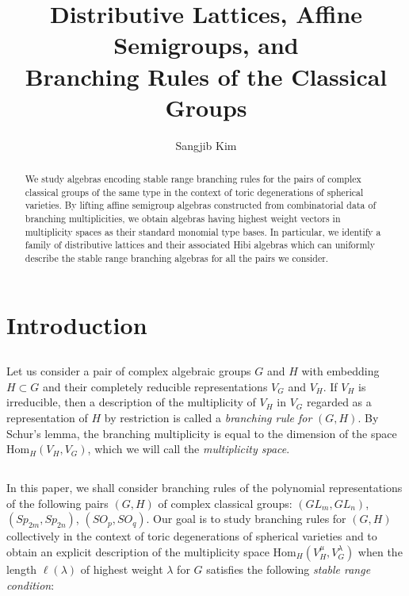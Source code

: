 \documentclass[11pt]{amsart}
\numberwithin{equation}{subsection}
\begin{document}
\title[Stable Range Branching Algebras]{Distributive Lattices, Affine Semigroups, and\\
Branching Rules of the Classical Groups}
\author{Sangjib Kim}
\address{School of Mathematics and Physics, The University of Queensland, St Lucia, QLD 4072, Australia}

\begin{abstract}
We study algebras encoding stable range branching
rules for the pairs of complex classical groups of the same type in the
context of toric degenerations of spherical varieties. By lifting affine semigroup
algebras constructed from combinatorial data of branching multiplicities, we
obtain algebras having highest weight vectors in multiplicity spaces as
their standard monomial type bases. In particular, we identify a family of 
distributive lattices and their associated Hibi algebras which can uniformly 
describe the stable range branching algebras for all the pairs we consider.
\end{abstract}

\maketitle

\section{Introduction}

\subsection{}
Let us consider a pair of complex algebraic groups $G$ and $H$ with
embedding $H \subset G$ and their completely reducible representations $V_{G}$ and $V_{H}$. 
If $V_{H}$ is irreducible, then a description of the multiplicity of $V_{H}$ in $V_{G}$ 
regarded as a representation of $H$ by restriction is called a \textit{branching rule for} $(G,H)$. 
By Schur's lemma, the branching multiplicity is equal to the dimension of the space 
$\mathrm{Hom}_{H}(V_{H},V_{G})$, which we will call the \textit{multiplicity space}.

\subsection{}\label{def_stable}
In this paper, we shall consider branching rules of the polynomial
representations of the following pairs $(G,H)$ of complex classical
groups: $({GL}_{m}, {GL}_{n})$, $({Sp}_{2m}, {Sp}_{2n})$, $({SO}_{p}, {SO}_{q})$.
Our goal is to study branching rules for $(G,H)$ collectively in the
context of toric degenerations of spherical varieties and to obtain an
explicit description of the multiplicity space $\mathrm{Hom}_{H}(V_{H}^{\mu}, 
V_{G}^{\lambda })$ when the length $\ell (\lambda )$ of highest weight 
$\lambda $ for $G$ satisfies the following \textit{stable range condition}:
\end{document}
